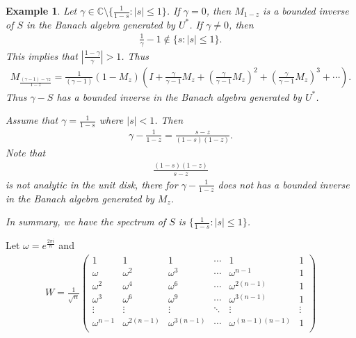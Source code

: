 \documentclass[a4paper,10pt]{amsart}
\newtheorem{example}{Example}[section]
\newcommand{\C}{\mathbb C} %
\begin{document}
\begin{example}
Let $\gamma \in \C \setminus \{\frac{1}{1-s} : |s| \leq 1 \}$.
If $\gamma = 0$, then $M_{1-z}$ is a bounded inverse of $S$ in the
Banach algebra generated by $U^{*}$.
If $\gamma \neq 0$, then
\begin{align*}
    \frac{1}{\gamma} -1 \notin \{s : |s| \leq 1\}. 
\end{align*}
This implies that $|\frac{1-\gamma}{\gamma}| > 1$. Thus
\begin{align*}
    M_{\frac{(\gamma -1)-\gamma z}{1-z}} = 
    \frac{1}{(\gamma -1)}(1-M_{z})(I + \frac{\gamma}{\gamma-1}M_{z}
    + (\frac{\gamma}{\gamma-1}M_{z})^{2} 
    + (\frac{\gamma}{\gamma-1}M_{z})^{3}
    + \cdots). 
\end{align*}
Thus $\gamma - S$ has a bounded inverse in the Banach algebra generated
by $U^{*}$.

Assume that $\gamma = \frac{1}{1-s}$ where $|s| < 1$. Then
\begin{align*}
    \gamma - \frac{1}{1-z} = \frac{s-z}{(1-s)(1-z)}. 
\end{align*}
Note that
\begin{align*}
    \frac{(1-s)(1-z)}{s-z}
\end{align*}
is not analytic in the unit disk, there for $\gamma - \frac{1}{1-z}$ 
does not has a bounded inverse in the Banach algebra generated by $M_z$.

In summary, we have the spectrum of $S$ is $\{\frac{1}{1-s}: |s| \leq 1\}$. 

\end{example}

Let $\omega = e^{\frac{2 \pi i}{n}}$ and  
\begin{align*}
    W = \frac{1}{\sqrt{n}}\begin{pmatrix}
       1 & 1 & 1 & \cdots & 1 & 1 \\
       \omega & \omega^{2} & \omega^{3} & \cdots & \omega^{n-1} & 1 \\ 
       \omega^{2} & \omega^{4} & \omega^{6}&\cdots & \omega^{2(n-1)} & 1 \\ 
       \omega^{3} & \omega^{6} & \omega^{9}&\cdots & \omega^{3(n-1)} & 1 \\ 
       \vdots & \vdots & \vdots & \ddots & \vdots & \vdots  \\
       \omega^{n-1} & \omega^{2(n-1)} & \omega^{3(n-1)} & 
       \cdots & \omega^{(n-1)(n-1)} & 1 \\ 
   \end{pmatrix} 
\end{align*}
\end{document}
